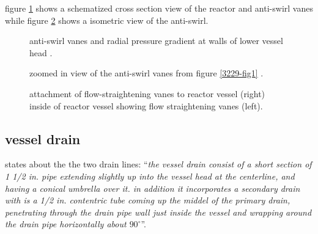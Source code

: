 \documentclass{article}
\newcommand*{\mrsarchive}{../../msr-archive}%
\begin{document}
figure \ref{3229-fig9} shows a schematized cross section view of the reactor and anti-swirl vanes while figure \ref{3229-fig1-zoom-strainer} shows a isometric view of the anti-swirl.

\begin{figure}[H]
  \centering
  \caption{anti-swirl vanes and radial pressure gradient at walls of lower vessel head \parencite[figure 9]{ornl-tm-3229}.}
  \label{3229-fig9}
\end{figure}

\begin{figure}[H]
  \centering
  \caption{zoomed in view of the anti-swirl vanes from figure \ref{3229-fig1} \parencite[figure 1]{ornl-tm-3229}.}
  \label{3229-fig1-zoom-strainer}
\end{figure}

\begin{figure}[H]
  \centering
  \caption{attachment of flow-straightening vanes to reactor vessel \parencite[figure 37]{ornl-3708} (right) inside of reactor vessel showing flow straightening vanes \parencite[figure 1.3]{ornl-3369} (left).}
  \label{3369-fig1.3}
\end{figure}



\subsection{vessel drain}
\label{sec:drain}
\textcite[page 14-15]{ornl-tm-3229} states about the the two drain lines:
\enquote{\textit{the vessel drain consist of a short section of 1 1/2 in. pipe extending slightly up into the vessel head at the centerline, and having a conical umbrella over it. in addition it incorporates a secondary drain with is a 1/2 in. contentric tube coming up the middel of the primary drain, penetrating through the drain pipe wall just inside the vessel and wrapping around the drain pipe horizontally about $90^\circ$}}.
\end{document}
